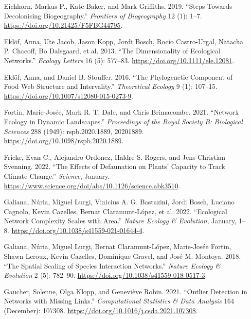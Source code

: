 \documentclass[
  letterpaper,
  DIV=11,
  numbers=noendperiod]{scrartcl}
\newlength{\cslhangindent}
\newlength{\cslentryspacingunit} %
\newenvironment{CSLReferences}[2] %
 {%
  \setlength{\parindent}{0pt}
  \ifodd #1
  \let\oldpar\par
  \def\par{\hangindent=\cslhangindent\oldpar}
  \fi
  \setlength{\parskip}{#2\cslentryspacingunit}
 }%
 {}
\begin{document}
\begin{CSLReferences}{1}{0}
\leavevmode{}%
Eichhorn, Markus P., Kate Baker, and Mark Griffiths. 2019. {``Steps
Towards Decolonising Biogeography.''} \emph{Frontiers of Biogeography}
12 (1): 1--7. \url{https://doi.org/10.21425/F5FBG44795}.

\leavevmode{}%
Eklöf, Anna, Ute Jacob, Jason Kopp, Jordi Bosch, Rocío Castro-Urgal,
Natacha P. Chacoff, Bo Dalsgaard, et al. 2013. {``The Dimensionality of
Ecological Networks.''} \emph{Ecology Letters} 16 (5): 577--83.
\url{https://doi.org/10.1111/ele.12081}.

\leavevmode{}%
Eklöf, Anna, and Daniel B. Stouffer. 2016. {``The Phylogenetic Component
of Food Web Structure and Intervality.''} \emph{Theoretical Ecology} 9
(1): 107--15. \url{https://doi.org/10.1007/s12080-015-0273-9}.

\leavevmode{}%
Fortin, Marie-Josée, Mark R. T. Dale, and Chris Brimacombe. 2021.
{``Network Ecology in Dynamic Landscapes.''} \emph{Proceedings of the
Royal Society B: Biological Sciences} 288 (1949): rspb.2020.1889,
20201889. \url{https://doi.org/10.1098/rspb.2020.1889}.

\leavevmode{}%
Fricke, Evan C., Alejandro Ordonez, Haldre S. Rogers, and Jens-Christian
Svenning. 2022. {``The Effects of Defaunation on Plants' Capacity to
Track Climate Change.''} \emph{Science}, January.
\url{https://www.science.org/doi/abs/10.1126/science.abk3510}.

\leavevmode{}%
Galiana, Núria, Miguel Lurgi, Vinicius A. G. Bastazini, Jordi Bosch,
Luciano Cagnolo, Kevin Cazelles, Bernat Claramunt-López, et al. 2022.
{``Ecological Network Complexity Scales with Area.''} \emph{Nature
Ecology \& Evolution}, January, 1--8.
\url{https://doi.org/10.1038/s41559-021-01644-4}.

\leavevmode{}%
Galiana, Núria, Miguel Lurgi, Bernat Claramunt-López, Marie-Josée
Fortin, Shawn Leroux, Kevin Cazelles, Dominique Gravel, and José M.
Montoya. 2018. {``The Spatial Scaling of Species Interaction
Networks.''} \emph{Nature Ecology \& Evolution} 2 (5): 782--90.
\url{https://doi.org/10.1038/s41559-018-0517-3}.

\leavevmode{}%
Gaucher, Solenne, Olga Klopp, and Geneviève Robin. 2021. {``Outlier
Detection in Networks with Missing Links.''} \emph{Computational
Statistics \& Data Analysis} 164 (December): 107308.
\url{https://doi.org/10.1016/j.csda.2021.107308}.


\end{CSLReferences}
\end{document}
